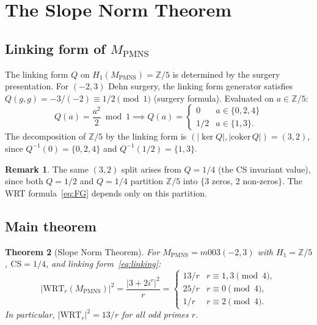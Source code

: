 \documentclass[11pt,a4paper]{article}
\newtheorem{theorem}{Theorem}
\theoremstyle{definition}
\newtheorem{remark}[theorem]{Remark}
\newcommand{\MPMNS}{M_{\mathrm{PMNS}}}
\newcommand{\ZZ}{\mathbb{Z}}
\newcommand{\Zfive}{\mathbb{Z}/5}
\newcommand{\WRT}{\mathrm{WRT}}
\newcommand{\CS}{\mathrm{CS}}
\begin{document}
\section{The Slope Norm Theorem}
\label{sec:slope_norm}

\subsection{Linking form of $\MPMNS$}

The linking form $Q$ on $H_1(\MPMNS) = \Zfive$ is determined by the
surgery presentation.
For $(-2,3)$ Dehn surgery, the linking form generator satisfies
$Q(g,g) = -3/(-2) \equiv 1/2 \pmod{1}$ (surgery formula).
Evaluated on $a \in \ZZ/5$:
\begin{equation}
Q(a) = \frac{a^2}{2} \bmod 1
\implies
Q(a) =
\begin{cases} 0 & a \in \{0,2,4\} \\ 1/2 & a \in \{1,3\}. \end{cases}
\label{eq:linking}
\end{equation}
The decomposition of $\Zfive$ by the linking form is
$(|\ker Q|, |\mathrm{coker}\,Q|) = (3,2)$,
since $Q^{-1}(0) = \{0,2,4\}$ and $Q^{-1}(1/2) = \{1,3\}$.

\begin{remark}
The same $(3,2)$ split arises from $Q = 1/4$ (the CS invariant value),
since both $Q=1/2$ and $Q=1/4$ partition $\ZZ/5$ into
$\{$3 zeros, 2 non-zeros$\}$.
The WRT formula~\eqref{eq:FG} depends only on this partition.
\end{remark}

\subsection{Main theorem}

\begin{theorem}[Slope Norm Theorem]
\label{thm:slope_norm}
For $\MPMNS = m003(-2,3)$ with $H_1 = \Zfive$, $\CS = 1/4$,
and linking form~\eqref{eq:linking}:
\begin{equation}
|\WRT_r(\MPMNS)|^2 = \frac{|3 + 2i^r|^2}{r}
= \begin{cases}
13/r & r \equiv 1,3 \pmod{4}, \\
25/r & r \equiv 0 \pmod{4}, \\
1/r  & r \equiv 2 \pmod{4}.
\end{cases}
\label{eq:master}
\end{equation}
In particular, $|\WRT_r|^2 = 13/r$ for all odd primes $r$.
\end{theorem}
\end{document}
